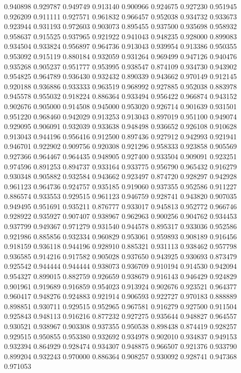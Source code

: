 0.940898
0.929787
0.949749
0.913140
0.900966
0.924675
0.927230
0.951945
0.926209
0.911111
0.927571
0.961832
0.966457
0.952038
0.934732
0.933673
0.923944
0.931193
0.972603
0.903073
0.895455
0.937500
0.935698
0.958932
0.958637
0.915525
0.937965
0.921922
0.941043
0.948235
0.928000
0.899083
0.934504
0.933824
0.956897
0.964736
0.913043
0.939954
0.913386
0.950355
0.953092
0.915119
0.880184
0.932059
0.931264
0.969499
0.947126
0.940476
0.935268
0.905237
0.951777
0.953995
0.938547
0.874109
0.934730
0.943902
0.954825
0.964789
0.936430
0.932432
0.890339
0.943662
0.970149
0.912145
0.920188
0.936886
0.933333
0.963519
0.968992
0.927885
0.952038
0.883978
0.945578
0.955032
0.918224
0.886364
0.933494
0.956422
0.966874
0.943152
0.902676
0.905000
0.914508
0.945000
0.953020
0.926714
0.901639
0.931501
0.951220
0.968460
0.942029
0.913253
0.913043
0.897019
0.951100
0.949074
0.929095
0.906091
0.932039
0.933638
0.948498
0.936652
0.926108
0.910628
0.913043
0.944196
0.956416
0.912500
0.897436
0.927912
0.942993
0.921941
0.946701
0.922902
0.909756
0.920308
0.921296
0.958333
0.923858
0.905569
0.927366
0.964467
0.964435
0.948905
0.927400
0.933504
0.909091
0.923251
0.974596
0.891253
0.894737
0.933164
0.933775
0.956790
0.965432
0.916279
0.930348
0.905882
0.932584
0.943662
0.923497
0.874720
0.928297
0.942928
0.961123
0.964736
0.924757
0.935185
0.919060
0.937355
0.952586
0.911227
0.886574
0.933553
0.929515
0.961123
0.946759
0.928741
0.943820
0.907035
0.949495
0.951691
0.935211
0.876777
0.933017
0.945813
0.952772
0.966746
0.928922
0.935927
0.907407
0.938967
0.962963
0.900256
0.904762
0.934453
0.937799
0.949367
0.971279
0.931540
0.944578
0.895317
0.933036
0.952586
0.921986
0.885856
0.932334
0.960829
0.953061
0.959893
0.908189
0.916456
0.918159
0.936118
0.944196
0.928910
0.885321
0.931113
0.938462
0.957798
0.936585
0.914216
0.917582
0.905028
0.937650
0.943925
0.930693
0.873479
0.925542
0.944444
0.944444
0.938073
0.936709
0.910194
0.914530
0.942094
0.954327
0.899015
0.882759
0.926659
0.938679
0.916143
0.946429
0.924829
0.901961
0.919689
0.916859
0.954023
0.913924
0.902676
0.923521
0.964377
0.960417
0.948276
0.924883
0.921914
0.906593
0.922727
0.970183
0.888889
0.898851
0.930711
0.929515
0.952965
0.967581
0.916279
0.927500
0.911504
0.925843
0.948113
0.916216
0.877232
0.927275
0.935644
0.948827
0.964557
0.930521
0.938967
0.903308
0.937355
0.950538
0.898438
0.874419
0.928257
0.929515
0.950855
0.953380
0.932692
0.934978
0.902010
0.934837
0.949153
0.932394
0.864929
0.928474
0.934307
0.948875
0.966507
0.921376
0.933790
0.899204
0.932243
0.970000
0.886364
0.908257
0.930092
0.928741
0.947368
0.971053
